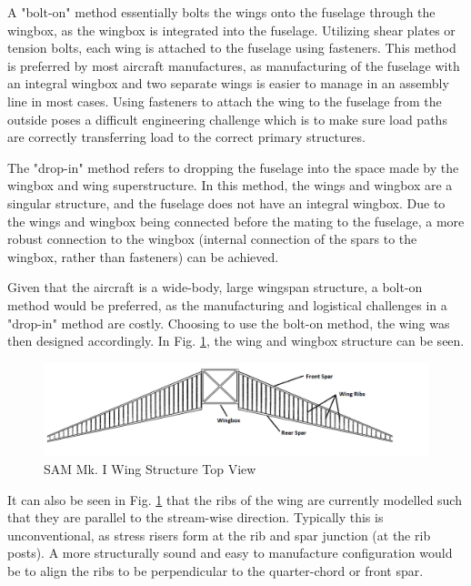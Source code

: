 A "bolt-on" method essentially bolts the wings onto the fuselage through the wingbox, as the wingbox is integrated into the fuselage. Utilizing shear plates or tension bolts, each wing is attached to the fuselage using fasteners. This method is preferred by most aircraft manufactures, as manufacturing of the fuselage with an integral wingbox and two separate wings is easier to manage in an assembly line in most cases. Using fasteners to attach the wing to the fuselage from the outside poses a difficult engineering challenge which is to make sure load paths are correctly transferring load to the correct primary structures.

The "drop-in" method refers to dropping the fuselage into the space made by the wingbox and wing superstructure. In this method, the wings and wingbox are a singular structure, and the fuselage does not have an integral wingbox. Due to the wings and wingbox being connected before the mating to the fuselage, a more robust connection to the wingbox (internal connection of the spars to the wingbox, rather than fasteners) can be achieved. 

Given that the aircraft is a wide-body, large wingspan structure, a bolt-on method would be preferred, as the manufacturing and logistical challenges in a "drop-in" method are costly. Choosing to use the bolt-on method, the wing was then designed accordingly. In Fig. \ref{fig:wing_structure}, the wing and wingbox structure can be seen.

\begin{figure}[!h]
    \centering
    \includegraphics[width=\linewidth]{Photos/structuresandloads/Wing Structure.PNG}
    \caption{SAM Mk. I Wing Structure Top View}
    \label{fig:wing_structure}
\end{figure}
\FloatBarrier

It can also be seen in Fig. \ref{fig:wing_structure} that the ribs of the wing are currently modelled such that they are parallel to the stream-wise direction. Typically this is unconventional, as stress risers form at the rib and spar junction (at the rib posts). A more structurally sound and easy to manufacture configuration would be to align the ribs to be perpendicular to the quarter-chord or front spar.

